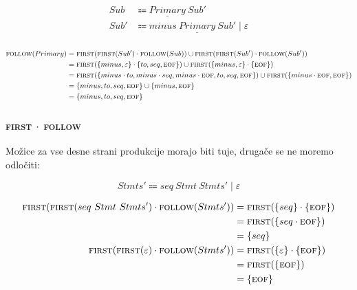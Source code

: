\documentclass{report}
\newcommand{\Null}{\varepsilon}
\newcommand{\Seq}{\cdot}
\newcommand{\Spc}{\ }
\newcommand{\Union}{\mathrel{|}}
\newcommand{\FIRST}{\textsc{first}}
\newcommand{\FOLLOW}{\textsc{follow}}
\newcommand{\EOF}{\textsc{eof}}
\newcommand{\Arrow}{\Coloneq}
\newcommand{\NT}[1]{{#1}}
\newcommand{\T}[1]{{#1}}
\begin{document}
\begin{equation*}
  \begin{aligned}
    \NT{Sub} &\Arrow \underline{\NT{Primary}} \Spc \NT{Sub'}\\
    \NT{Sub'} &\Arrow \T{minus} \Spc \underline{\NT{Primary}} \Spc \NT{Sub'} \Union \Null\\
  \end{aligned}
\end{equation*}

\begin{equation*}
  \begin{aligned}
    \FOLLOW(\NT{Primary}) &= \FIRST(\FIRST(\NT{Sub'}) \Seq \FOLLOW(\NT{Sub})) \cup \FIRST(\FIRST(\NT{Sub'}) \Seq \FOLLOW(\NT{Sub'})) \\
    &= \FIRST(\{\T{minus}, \Null\} \Seq \{\T{to}, \T{seq}, \EOF\}) \cup \FIRST(\{\T{minus}, \Null\} \Seq \{\EOF\})\\
    &= \FIRST(\{\T{minus} \Seq \T{to}, \T{minus} \Seq \T{seq}, \T{minus} \Seq \EOF, \T{to}, \T{seq}, \EOF\}) \cup \FIRST(\{\T{minus} \Seq \EOF, \EOF\})\\ 
    &= \{\T{minus}, \T{to}, \T{seq}, \EOF\} \cup \{\T{minus}, \EOF\}\\
    &= \{\T{minus}, \T{to}, \T{seq}, \EOF\}
  \end{aligned}
\end{equation*}

\subsubsection*{{\FIRST} $\Seq$ {\FOLLOW}}

Možice za vse desne strani produkcije morajo biti tuje, drugače se ne moremo odločiti:

\begin{equation*}
    \NT{Stmts'} \Arrow \T{seq} \Spc \NT{Stmt} \Spc \NT{Stmts'} \Union \Null
\end{equation*}

\begin{equation*}
  \begin{aligned}
    \FIRST(\FIRST(\T{seq} \Spc \NT{Stmt} \Spc \NT{Stmts'}) \Seq \FOLLOW(\NT{Stmts'})) &= \FIRST(\{\T{seq}\} \Seq \{\EOF\})\\
    &= \FIRST(\{\T{seq} \Seq \EOF\})\\
    &= \{\T{seq}\}\\
    \FIRST(\FIRST(\Null) \Seq \FOLLOW(\NT{Stmts'})) &= \FIRST(\{\Null\} \Seq \{\EOF\}) \\
    &= \FIRST(\{\EOF\}) \\
    &= \{\EOF\} \\
  \end{aligned}
\end{equation*}
\end{document}
